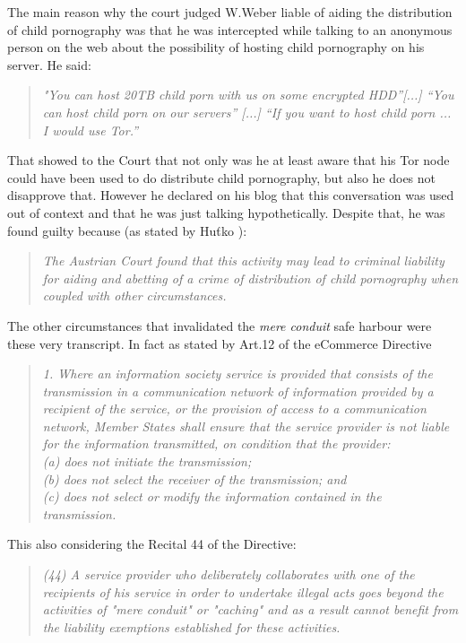 \documentclass[runningheads,a4paper]{llncs}
\begin{document}
The main reason why the court judged W.Weber liable of aiding the distribution of child pornography was that he was intercepted while talking to an anonymous person on the web about the possibility of hosting child pornography on his server. He said: 
\begin{quote}
    \textit{ "You can host 20TB child porn with us on some encrypted HDD”[...] “You can host child porn on our servers” [...] “If you want to host child porn ... I would use Tor.”}
\end{quote}
That showed to the Court that not only was he at least aware that his Tor node could have been used to do distribute child pornography, but also he does not disapprove that.
However he declared on his blog that this conversation was used out of context and that he was just talking hypothetically. 
Despite that, he was found guilty because (as stated by Huťko \cite{HUSOVEC}):
\begin{quote}
\textit{
    The Austrian Court found that this activity may lead to criminal liability for aiding and abetting of a crime of distribution of child pornography when coupled with other circumstances.}
\end{quote}
The other circumstances that invalidated the \textit{mere conduit} safe harbour were these very transcript. In fact as stated by Art.12 of the eCommerce Directive 
\begin{quote}
    \textit{1. Where an information society service is provided that consists of the transmission in a communication network of information provided by a recipient of the service, or the provision of access to a communication network, Member States shall ensure that the service provider is not liable for the information transmitted, on condition that the provider:\\
(a) does not initiate the transmission;\\
(b) does not select the receiver of the transmission; and\\
(c) does not select or modify the information contained in the transmission.}
\end{quote}

This also considering the Recital 44 of the Directive:

\begin{quote}
    \textit{
(44) A service provider who deliberately collaborates with one of the recipients of his service in order to undertake illegal acts goes beyond the activities of "mere conduit" or "caching" and as a result cannot benefit from the liability exemptions established for these activities.}
\end{quote}
\end{document}

